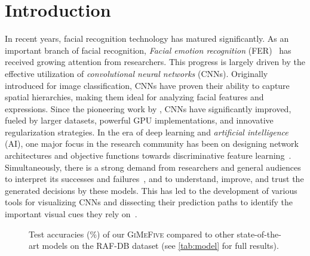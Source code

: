 \section{Introduction}
\label{sec:intro}

In recent years, facial recognition technology has matured significantly. 
As an important branch of facial recognition, 
\textit{Facial emotion recognition} (FER)~\cite{Ko18,JainSS19,YinTLS019,Malik0R21} has received growing attention from researchers. 
This progress is largely driven by the effective utilization of \textit{convolutional neural networks} (CNNs). 
Originally introduced for image classification, 
CNNs have proven their ability to capture spatial hierarchies, 
making them ideal for analyzing facial features and expressions. 
Since the pioneering work by \citet{Lecun89Backpropagation}, 
CNNs have significantly improved, fueled by larger datasets, 
powerful GPU implementations, 
and innovative regularization strategies. 
In the era of deep learning and \textit{artificial intelligence} (AI), 
one major focus in the research community has been on designing network architectures 
and objective functions towards discriminative feature learning~\cite{HeZRS16, liu2017learning, wen2016discriminative}. 
Simultaneously, 
there is a strong demand from researchers and general audiences to interpret its successes and failures~\cite{GoodfellowSS14}, 
and to understand, improve, and trust the generated decisions by these models. 
This has led to the development of various tools for visualizing CNNs and dissecting their prediction paths to identify the important visual cues they rely on~\cite{olah2018building}. 

\begin{figure}[ht]
  \centering
  \caption{Test accuracies (\%) of our \textsc{GiMeFive} 
  compared to other state-of-the-art models on the RAF-DB dataset (see \cref{tab:model} for full results).} 
  \label{fig:acc}
\end{figure}

